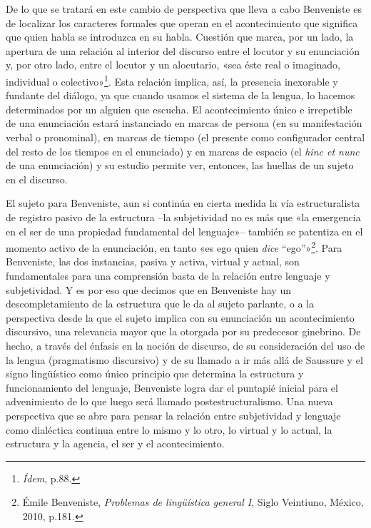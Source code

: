 De lo que se tratará en este cambio de perspectiva que lleva a cabo Benveniste es de localizar los caracteres formales que operan en el acontecimiento que significa que quien habla se introduzca en su habla. Cuestión que marca, por un lado, la apertura de una relación al interior del discurso entre el locutor y su enunciación y, por otro lado, entre el locutor y un alocutario, «sea éste real o imaginado, individual o colectivo»\footnote{\emph{Ídem}, p.88.}. Esta relación implica, así, la presencia inexorable y fundante del diálogo, ya que cuando usamos el sistema de la lengua, lo hacemos determinados por un alguien que escucha. El acontecimiento único e irrepetible de una enunciación estará instanciado en marcas de persona (en su manifestación verbal o pronominal), en marcas de tiempo (el presente como configurador central del resto de los tiempos en el enunciado) y en marcas de espacio (el \emph{hinc et nunc} de una enunciación) y su estudio permite ver, entonces, las huellas de un sujeto en el discurso.

El sujeto para Benveniste, aun si continúa en cierta medida la vía estructuralista de registro pasivo de la estructura --la subjetividad no es más que «la emergencia en el ser de una propiedad fundamental del lenguaje»-- también se patentiza en el momento activo de la enunciación, en tanto «es ego quien \emph{dice} ``ego''»\footnote{Émile Benveniste, \emph{Problemas de lingüística general I}, Siglo Veintiuno, México, 2010, p.181.}. Para Benveniste, las dos instancias, pasiva y activa, virtual y actual, son fundamentales para una comprensión basta de la relación entre lenguaje y subjetividad. Y es por eso que decimos que en Benveniste hay un descompletamiento de la estructura que le da al sujeto parlante, o a la perspectiva desde la que el sujeto implica con su enunciación un acontecimiento discursivo, una relevancia mayor que la otorgada por su predecesor ginebrino. De hecho, a través del énfasis en la noción de discurso, de su consideración del uso de la lengua (pragmatismo discursivo) y de su llamado a ir más allá de Saussure y el signo lingüístico como único principio que determina la estructura y funcionamiento del lenguaje, Benveniste logra dar el puntapié inicial para el advenimiento de lo que luego será llamado postestructuralismo. Una nueva perspectiva que se abre para pensar la relación entre subjetividad y lenguaje como dialéctica continua entre lo mismo y lo otro, lo virtual y lo actual, la estructura y la agencia, el ser y el acontecimiento.

